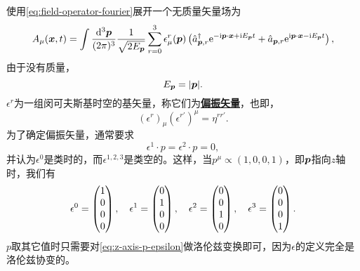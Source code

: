\documentclass[hyperref, UTF8, a4paper]{ctexart}
\newcommand*{\ii}{\mathrm{i}}
\newcommand*{\ee}{\mathrm{e}}
\newcommand{\concept}[1]{\underline{\textbf{#1}}}
\begin{document}
使用\eqref{eq:field-operator-fourier}展开一个无质量矢量场为
\begin{equation}
    A_\mu (\vb*{x}, t) = \int \frac{\dd[3]{\vb*{p}}}{(2\pi)^3} \frac{1}{\sqrt{2 E_{\vb*{p}}}} \sum_{r=0}^3 \epsilon_\mu^r(\vb*{p}) \left(\hat{a}_{\vb*{p}, r}^\dagger \ee^{ - \ii \vb*{p} \cdot \vb*{x} + \ii E_{\vb*{p}} t} + \hat{a}_{\vb*{p}, r} \ee^{ \ii \vb*{p} \cdot \vb*{x} - \ii E_{\vb*{p}} t} \right), 
    \label{eq:expanding-massless-vector-field}
\end{equation}
由于没有质量，
\begin{equation}
    E_{\vb*{p}} = \abs{\vb*{p}}.
\end{equation}
$\epsilon^r$为一组闵可夫斯基时空的基矢量，称它们为\concept{偏振矢量}，也即，
\begin{equation}
    (\epsilon^r)_\mu (\epsilon^{r'})^\mu = \eta^{r r'}.
\end{equation}
为了确定偏振矢量，通常要求
\begin{equation}
    \epsilon^1 \cdot p = \epsilon^2 \cdot p = 0,
\end{equation}
并认为$\epsilon^0$是类时的，而$\epsilon^{1,2,3}$是类空的。这样，当$p^\mu \propto (1, 0, 0, 1)$，即$\vb*{p}$指向$z$轴时，我们有
\begin{equation}
    \epsilon^0 = \pmqty{1 \\ 0 \\ 0 \\ 0}, \quad \epsilon^1 = \pmqty{0 \\ 1 \\ 0 \\ 0}, \quad \epsilon^2 = \pmqty{0 \\ 0 \\ 1 \\ 0}, \quad \epsilon^3 = \pmqty{0 \\ 0 \\ 0 \\ 1}.
    \label{eq:z-axis-p-epsilon}
\end{equation}
$p$取其它值时只需要对\eqref{eq:z-axis-p-epsilon}做洛伦兹变换即可，因为$\epsilon$的定义完全是洛伦兹协变的。
\end{document}
